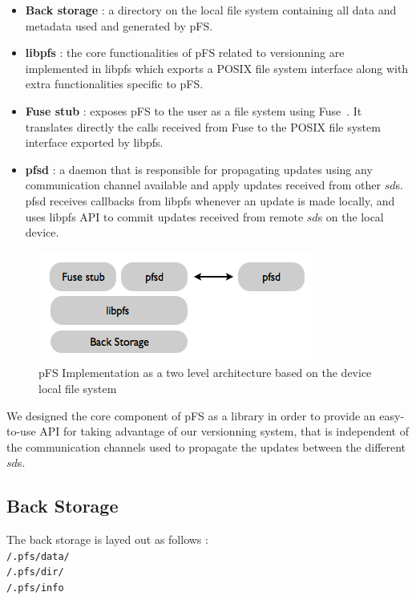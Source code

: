 \begin {itemize}
\item \textbf{Back storage} : a directory on the local file system
  containing all data and metadata used and generated by pFS.
\item \textbf{libpfs} : the core functionalities of pFS related to
  versionning are implemented in libpfs which exports a POSIX file
  system interface along with extra functionalities specific to
  pFS.
\item \textbf{Fuse stub} : exposes pFS to the user as a file system
  using Fuse~\cite{henk:fuse}. It translates directly the calls
  received from Fuse to the POSIX file system interface exported by
  libpfs.
\item \textbf{pfsd} : a daemon that is responsible for propagating
  updates using any communication channel available and apply updates
  received from other $sd$s. pfsd receives callbacks from libpfs
  whenever an update is made locally, and uses libpfs API to commit
  updates received from remote $sd$s on the local device.
\end {itemize}

\begin{figure}[ht]
\begin{center}
  \includegraphics [scale=0.6] {img/impl}
  \caption{\label{PfsImpl} {\small pFS Implementation as a two level
      architecture based on the device local file system}}
\end{center}
\end{figure}

We designed the core component of pFS as a library in order to provide
an easy-to-use API for taking advantage of our versionning system, that
is independent of the communication channels used to propagate the
updates between the different $sd$s.

\subsection {Back Storage}

The back storage is layed out as follows : \\ 
{\tt /.pfs/data/} \\ 
{\tt /.pfs/dir/} \\ 
{\tt /.pfs/info} \\ 

